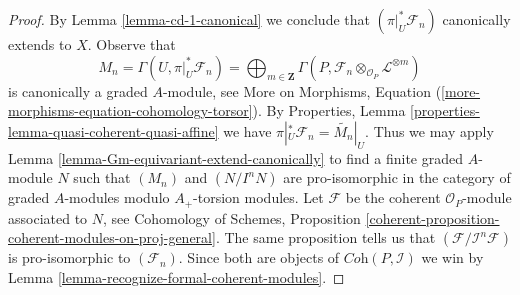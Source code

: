 \documentclass[10pt,a4paper]{amsart}
\theoremstyle{plain}
\theoremstyle{definition}
\theoremstyle{remark}
\numberwithin{equation}{subsection}
\begin{document}
\begin{proof}
\medskip\noindent
By Lemma \ref{lemma-cd-1-canonical} we conclude that
$(\pi|_U^*\mathcal{F}_n)$ canonically extends to $X$.
Observe that
$$
M_n = \Gamma(U, \pi|_U^*\mathcal{F}_n) =
\bigoplus\nolimits_{m \in \mathbf{Z}}
\Gamma(P, \mathcal{F}_n \otimes_{\mathcal{O}_P} \mathcal{L}^{\otimes m})
$$
is canonically a graded $A$-module, see
More on Morphisms, Equation (\ref{more-morphisms-equation-cohomology-torsor}).
By Properties, Lemma \ref{properties-lemma-quasi-coherent-quasi-affine}
we have $\pi|_U^*\mathcal{F}_n = \widetilde{M_n}|_U$.
Thus we may apply Lemma \ref{lemma-Gm-equivariant-extend-canonically}
to find a finite graded $A$-module $N$ such that
$(M_n)$ and $(N/I^nN)$ are pro-isomorphic in the category
of graded $A$-modules modulo $A_+$-torsion modules.
Let $\mathcal{F}$ be the coherent $\mathcal{O}_P$-module
associated to $N$, see
Cohomology of Schemes, Proposition
\ref{coherent-proposition-coherent-modules-on-proj-general}.
The same proposition tells us that $(\mathcal{F}/\mathcal{I}^n\mathcal{F})$
is pro-isomorphic to $(\mathcal{F}_n)$.
Since both are objects of $\textit{Coh}(P, \mathcal{I})$
we win by Lemma \ref{lemma-recognize-formal-coherent-modules}.
\end{proof}
\end{document}
